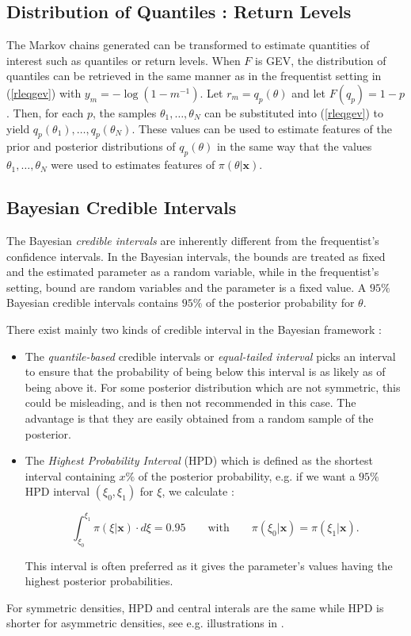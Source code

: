 \subsection{Distribution of Quantiles : Return Levels}

The Markov chains generated can be transformed to estimate quantities of interest such as quantiles or return levels.
When $F$ is GEV, the distribution of quantiles can be retrieved in the same manner as in the frequentist setting in (\ref{rleqgev}) with $y_m = -\log(1-m^{-1})$. Let $r_m= q_p(\theta)$ and let $F(q_p)=1-p$. Then, for each $p$, the samples $\theta_1,\ldots,\theta_N$ can be substituted into (\ref{rleqgev}) to yield $q_p(\theta_1),\ldots,q_p(\theta_N)$. These values can be used to estimate features of the prior and posterior distributions of $q_p(\theta)$ in the same way that the values $\theta_1,\ldots,\theta_N$ were used to estimates features of $\pi(\theta|\boldsymbol{x})$. 


\subsection{Bayesian Credible Intervals}\label{bayes_cred_int}

The Bayesian \emph{credible intervals} are inherently different from the frequentist's confidence intervals. In the Bayesian intervals, the bounds are treated as fixed and the estimated parameter as a random variable, while in the frequentist's setting, bound are random variables and the parameter is a fixed value. A $95\%$ Bayesian credible intervals contains $95\%$ of the posterior probability for $\theta$.

There exist mainly two kinds of credible interval in the Bayesian framework : 

\begin{itemize}
	\item The \emph{quantile-based} credible intervals or \emph{equal-tailed interval} picks an interval to ensure that the probability of being below this interval is as likely as of being above it. 
	For some posterior distribution which are not symmetric, this could be misleading, and is then not recommended in this case. 
	The advantage is that they are easily obtained from a random sample of the posterior.
	\item The \emph{Highest Probability Interval} (HPD) which is defined as the shortest interval containing $x\%$ of the posterior probability, e.g. if we want a $95\%$ HPD interval $(\xi_0,\xi_1)$ for $\xi$, we calculate :
		
	\begin{equation} 
	\int_{\xi_0}^{\xi_1}\pi(\xi|\boldsymbol{x})\cdot d\xi=0.95 \qquad\text{with}\qquad \pi(\xi_0|\boldsymbol{x})=\pi(\xi_1|\boldsymbol{x}).
	\end{equation}
		
	This interval is often preferred as it gives the parameter's values having the highest posterior probabilities. 
		
\end{itemize}
For symmetric densities, HPD and central interals are the same while HPD is shorter for asymmetric densities, see e.g. illustrations in \citet{liu_simulation-efficient_2015}.



